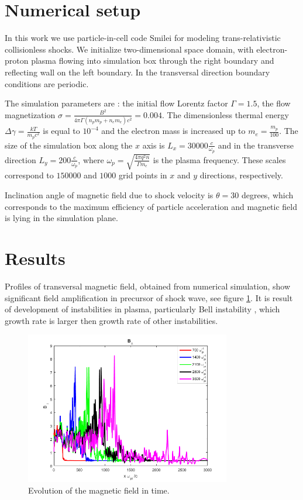 \documentclass[a4paper]{jpconf}
\begin{document}
	
	\section{Numerical setup}
	In this work we use particle-in-cell code Smilei \cite{Smilei18} for modeling trans-relativistic collisionless shocks. We initialize two-dimensional space domain, with electron-proton plasma flowing into simulation box through the right boundary and reflecting wall on the left boundary. In the transversal direction boundary conditions are periodic.
	
	The simulation parameters are : the initial flow Lorentz factor $\Gamma = 1.5$, the flow magnetization $\sigma = \frac{B^2}{4\pi\Gamma (n_p m_p + n_e m_e) c^2} = 0.004$. The dimensionless thermal energy $\Delta \gamma = \frac{k T}{m_p c^2}$ is equal to $10^{-4}$ and the electron mass is increased up to $m_e = \frac{m_p}{100}$. The size of the simulation box along the $x$ axis is $L_x = 30000\frac{c}{\omega_p}$ and in the transverse direction $L_y = 200\frac{c}{\omega_p}$, where $\omega_p = \sqrt{\frac{4\pi q^2 n}{\Gamma m_e}}$ is the plasma frequency. These scales correspond to $150000$ and $1000$ grid points in $x$ and $y$ directions, respectively. 
	
	Inclination angle of magnetic field due to shock velocity is $\theta = 30$ degrees, which corresponds to the maximum efficiency of particle acceleration \cite{Romansky18} and magnetic field is lying in the simulation plane.
	
	
	\section{Results}
	
	Profiles of transversal magnetic field, obtained from numerical simulation, show significant field amplification in precursor of shock wave, see figure \ref{field}. It is result of development of instabilities in plasma, particularly Bell instability \cite{Bell04}, which growth rate is larger then growth rate of other instabilities.
	
	\begin{figure}[h!]
		\centering
		\includegraphics[width=0.8\textwidth]{fig/Bnorm.png} 
		\caption{Evolution of the magnetic field in time.}
		\label{field}
	\end{figure}
	
\end{document}
